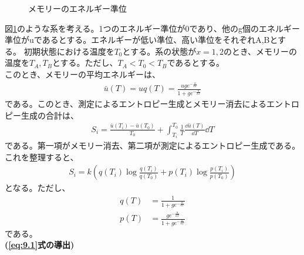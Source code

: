 \documentclass[a4paper,11pt]{jsarticle}
\numberwithin{equation}{section}
\begin{document}
\begin{figure}[H]
    \centering
{}
\caption{メモリーのエネルギー準位}
\label{fig:memory}
\end{figure}
図\ref{fig:memory}のような系を考える。1つのエネルギー準位が0であり、他のg個のエネルギー準位がuであるとする。エネルギーが低い準位、高い準位をそれぞれA,Bとする。
初期状態における温度を$T_0$とする。系の状態が$x =1,2$のとき、メモリーの温度を$T_A,T_B$とする。ただし、$T_A <T_0<T_B$であるとする。\\
このとき、メモリーの平均エネルギーは、
\begin{align}
    \bar{u}(T) = uq(T) = \frac{uge^{-\frac{u}{kT}}}{1+ge^{-\frac{u}{kT}}}
\end{align}
である。このとき、測定によるエントロピー生成とメモリー消去によるエントロピー生成の合計は、
\begin{align}
    S_i = \frac{\bar{u}(T_i)-\bar{u}(T_0)}{T_0} + \int_{T_i}^{T_0}\frac{1}{T}\frac{\dd \bar{u}(T)}{\dd T}\dd T
\end{align}
である。第一項がメモリー消去、第二項が測定によるエントロピー生成である。これを整理すると、%
\begin{align}
    S_i = k\left(q(T_i)\log\frac{q(T_i)}{q(T_0)} + p(T_i)\log\frac{p(T_i)}{p(T_0)}\right)
\end{align}
となる。ただし、
\begin{align}
    q(T) &= \frac{1}{1+ge^{-\frac{u}{kT}}} \\
    p(T) &= \frac{ge^{-\frac{u}{kT}}}{1+ge^{-\frac{u}{kT}}}
\end{align}
である。\\
\textbf{(\ref{eq:9.1}式の導出)}\\
\end{document}
